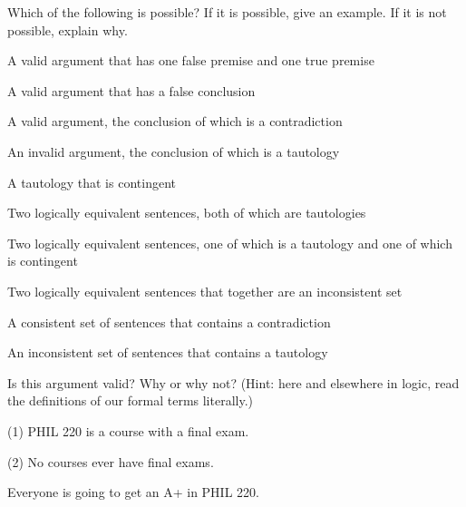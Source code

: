 \solutions
\problempart
\label{pr.EnglishCombinations}
Which of the following is possible? If it is possible, give an example. If it is not possible, explain why.
\begin{earg}
\item A valid argument that has one false premise and one true premise
\item A valid argument that has a false conclusion
\item A valid argument, the conclusion of which is a contradiction
\item An invalid argument, the conclusion of which is a tautology
\item A tautology that is contingent
\item Two logically equivalent sentences, both of which are tautologies
\item Two logically equivalent sentences, one of which is a tautology and one of which is contingent
\item Two logically equivalent sentences that together are an inconsistent set
\item A consistent set of sentences that contains a contradiction
\item An inconsistent set of sentences that contains a tautology
\end{earg}

\problempart
\label{pr.ImpossiblePremises}
Is this argument valid? Why or why not? (Hint: here and elsewhere in logic, read the definitions of our formal terms literally.)
\begin{earg}
\item[(1)] PHIL 220 is a course with a final exam.
\item[(2)] No courses ever have final exams.
\item[\therefore] Everyone is going to get an A+ in PHIL 220.
\end{earg}

